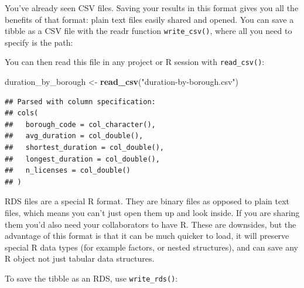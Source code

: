 \documentclass[]{Nemilov}
\newenvironment{Shaded}{\begin{snugshade}}{\end{snugshade}}
\newcommand{\KeywordTok}[1]{\textcolor[rgb]{0.13,0.29,0.53}{\textbf{#1}}}
\newcommand{\NormalTok}[1]{#1}
\newcommand{\OperatorTok}[1]{\textcolor[rgb]{0.81,0.36,0.00}{\textbf{#1}}}
\newcommand{\StringTok}[1]{\textcolor[rgb]{0.31,0.60,0.02}{#1}}
\begin{document}
You've already seen CSV files. Saving your results in this format gives you all the benefits of that format: plain text files easily shared and opened. You can save a tibble as a CSV file with the readr function \texttt{write\_csv()}, where all you need to specify is the path:

\begin{Shaded}
\end{Shaded}

You can then read this file in any project or R session with \texttt{read\_csv()}:

\begin{Shaded}
\begin{Highlighting}[]
\NormalTok{duration_by_borough <-}\StringTok{ }\KeywordTok{read_csv}\NormalTok{(}\StringTok{"duration-by-borough.csv"}\NormalTok{)}
\end{Highlighting}
\end{Shaded}

\begin{verbatim}
## Parsed with column specification:
## cols(
##   borough_code = col_character(),
##   avg_duration = col_double(),
##   shortest_duration = col_double(),
##   longest_duration = col_double(),
##   n_licenses = col_double()
## )
\end{verbatim}

RDS files are a special R format. They are binary files as opposed to plain text files, which means you can't just open them up and look inside. If you are sharing them you'd also need your collaborators to have R. These are downsides, but the advantage of this format is that it can be much quicker to load, it will preserve special R data types (for example factors, or nested structures), and can save any R object not just tabular data structures.

To save the tibble as an RDS, use \texttt{write\_rds()}:

\begin{Shaded}
\end{Shaded}
\end{document}
